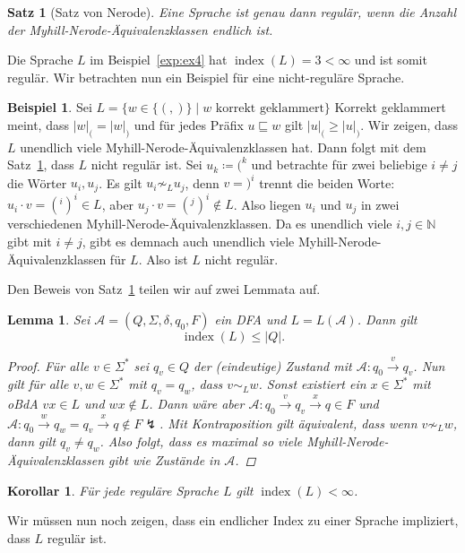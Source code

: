 \documentclass[11pt, a4paper]{article}
\theoremstyle{definition}
\newtheorem{example}[definition]{Beispiel}
\theoremstyle{plain}
\newtheorem{theorem}[definition]{Satz}
\newtheorem{lemma}[definition]{Lemma}
\newtheorem{corollary}[definition]{Korollar}
\numberwithin{equation}{section}
\newcommand{\reaches}[1]{\overset{#1}{\rightarrow}}
\DeclareMathOperator{\ind}{index}
\begin{document}
\begin{theorem}[Satz von Nerode]\label{thm:nerode}
	Eine Sprache ist genau dann regulär, wenn die Anzahl der Myhill-Nerode-Äquivalenzklassen endlich ist.
\end{theorem}
Die Sprache $L$ im Beispiel~\ref{exp:ex4} hat $\ind(L) = 3 < \infty$ und ist somit regulär. Wir betrachten nun ein Beispiel für eine nicht-reguläre Sprache.
\begin{example}
	Sei $L = \{w \in \{(, )\} \mid w \text{ korrekt geklammert}\}$ Korrekt geklammert meint, dass $|w|_( = |w|_)$ und für jedes Präfix $u \sqsubseteq w$ gilt $|u|_( \geq |u|_)$. Wir zeigen, dass $L$ unendlich viele Myhill-Nerode-Äquivalenzklassen hat. Dann folgt mit dem Satz~\ref{thm:nerode}, dass $L$ nicht regulär ist.
	Sei $u_k \coloneqq (^k$ und betrachte für zwei beliebige $i \neq j$ die Wörter $u_i, u_j$. Es gilt $u_i \not\sim_L u_j$, denn $v = )^i$ trennt die beiden Worte: $u_i \cdot v = (^i)^i \in L$, aber $u_j \cdot v = (^j)^i \notin L$. Also liegen $u_i$ und $u_j$ in zwei verschiedenen Myhill-Nerode-Äquivalenzklassen. Da es unendlich viele $i, j \in \mathbb{N}$ gibt mit $i \neq j$, gibt es demnach auch unendlich viele Myhill-Nerode-Äquivalenzklassen für $L$. Also ist $L$ nicht regulär.
\end{example}
Den Beweis von Satz~\ref{thm:nerode} teilen wir auf zwei Lemmata auf.
\begin{lemma}\label{lem:dfa2mnf}
	Sei $\mathcal{A} = (Q, \Sigma, \delta, q_0, F)$ ein DFA und $L = L(\mathcal{A})$. Dann gilt
	$$
		\ind(L) \leq |Q|.
	$$
	\begin{proof}
		Für alle $v \in \Sigma^\ast$ sei $q_v \in Q$ der (eindeutige) Zustand mit $\mathcal{A}: q_0 \reaches{v} q_v$. Nun gilt für alle $v, w \in \Sigma^\ast$ mit $q_v = q_w$, dass $v \sim_L w$. Sonst existiert ein $x \in \Sigma^\ast$ mit oBdA $vx \in L$ und $wx \notin L$. Dann wäre aber $\mathcal{A}: q_0 \reaches{v} q_v \reaches{x} q \in F$ und $\mathcal{A}: q_0 \reaches{w} q_w = q_v \reaches{x} q \notin F \lightning$. Mit Kontraposition gilt äquivalent, dass wenn $v \not\sim_L w$, dann gilt $q_v \neq q_w$. Also folgt, dass es maximal so viele Myhill-Nerode-Äquivalenzklassen gibt wie Zustände in $\mathcal{A}$.
	\end{proof}
\end{lemma}
\begin{corollary}\label{cor:reg2mnf}
	Für jede reguläre Sprache $L$ gilt $\ind(L) < \infty$.
\end{corollary}
Wir müssen nun noch zeigen, dass ein endlicher Index zu einer Sprache impliziert, dass $L$ regulär ist.
\end{document}
